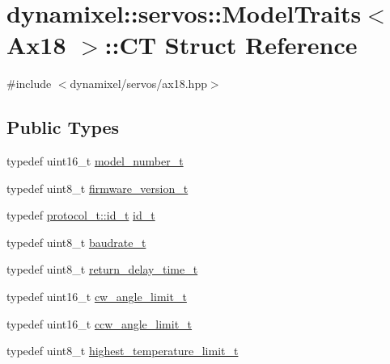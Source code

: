 \hypertarget{structdynamixel_1_1servos_1_1_model_traits_3_01_ax18_01_4_1_1_c_t}{}\section{dynamixel\+:\+:servos\+:\+:Model\+Traits$<$ Ax18 $>$\+:\+:C\+T Struct Reference}
\label{structdynamixel_1_1servos_1_1_model_traits_3_01_ax18_01_4_1_1_c_t}


{\ttfamily \#include $<$dynamixel/servos/ax18.\+hpp$>$}

\subsection*{Public Types}
\begin{DoxyCompactItemize}
\item 
typedef uint16\+\_\+t \hyperlink{structdynamixel_1_1servos_1_1_model_traits_3_01_ax18_01_4_1_1_c_t_a437fac337bfd18fc3e691f6f88f2bb7b}{model\+\_\+number\+\_\+t}
\item 
typedef uint8\+\_\+t \hyperlink{structdynamixel_1_1servos_1_1_model_traits_3_01_ax18_01_4_1_1_c_t_ac85f8672e5157970eb1564a9a7dee292}{firmware\+\_\+version\+\_\+t}
\item 
typedef \hyperlink{classdynamixel_1_1protocols_1_1_protocol1_a1d4dfa22b01f80b1876d14f539d52b5c}{protocol\+\_\+t\+::id\+\_\+t} \hyperlink{structdynamixel_1_1servos_1_1_model_traits_3_01_ax18_01_4_1_1_c_t_a3645632c4443b70ad251cde6a5e819d1}{id\+\_\+t}
\item 
typedef uint8\+\_\+t \hyperlink{structdynamixel_1_1servos_1_1_model_traits_3_01_ax18_01_4_1_1_c_t_a37d4200ff8dca006c8da3da602fcc312}{baudrate\+\_\+t}
\item 
typedef uint8\+\_\+t \hyperlink{structdynamixel_1_1servos_1_1_model_traits_3_01_ax18_01_4_1_1_c_t_a2ad0ce40d272ae8911e921a55927340e}{return\+\_\+delay\+\_\+time\+\_\+t}
\item 
typedef uint16\+\_\+t \hyperlink{structdynamixel_1_1servos_1_1_model_traits_3_01_ax18_01_4_1_1_c_t_aa00805d106a90248ed0a451835e6a205}{cw\+\_\+angle\+\_\+limit\+\_\+t}
\item 
typedef uint16\+\_\+t \hyperlink{structdynamixel_1_1servos_1_1_model_traits_3_01_ax18_01_4_1_1_c_t_a1340415777225a37fee7bd2add8ba47b}{ccw\+\_\+angle\+\_\+limit\+\_\+t}
\item 
typedef uint8\+\_\+t \hyperlink{structdynamixel_1_1servos_1_1_model_traits_3_01_ax18_01_4_1_1_c_t_ad5d339ef220bc7d5430e9d3e5879530c}{highest\+\_\+temperature\+\_\+limit\+\_\+t}

\end{DoxyCompactItemize}
